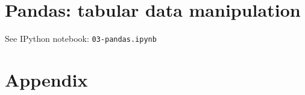 \documentclass[english,serif,mathserif,xcolor=pdftex,dvipsnames,table]{beamer}
\begin{document}
\part{Pandas: tabular data manipulation}

\begin{frame}

  {\Huge See IPython notebook:
    \texttt{03-pandas.ipynb}}
\end{frame}








\part{Appendix}
\end{document}
